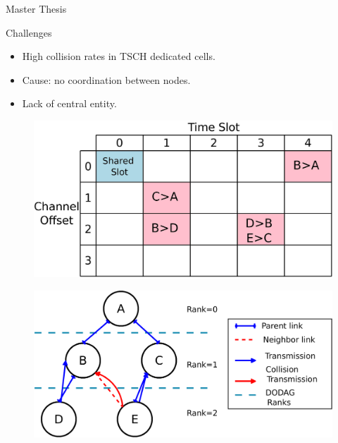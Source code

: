 \documentclass{beamer}
\begin{document}
\begin{frame}{Master Thesis}

\begin{minipage}[t]{0.48\linewidth}

\begin{block}{Challenges}
    \begin{itemize}
    
   
    \item High collision rates in TSCH dedicated cells.
     \item<2-> Cause: no coordination between nodes. 
      \item<3-> Lack of central entity. 
      
     
    
    \end{itemize}
    \end{block}
\end{minipage}\hfill
\begin{minipage}[t]{0.48\linewidth}
\centering
\begin{figure}[p]

\includegraphics[width=\linewidth]{TSCH.jpeg}

\end{figure}
\begin{figure}[p]


\item<2-> \includegraphics[width=\linewidth]{Diagram1.png}
\end{figure}
\end{minipage}
\end{frame}
\end{document}
